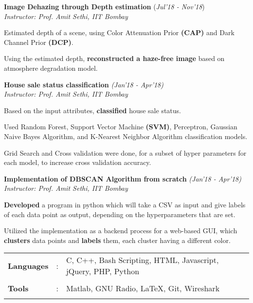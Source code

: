 \documentclass[10pt]{article}
\newcommand{\highlight}[1]{\framecolorbox[\textwidth]{black}{bl}{\makebox[\textwidth][l]{\bfseries \color{black} #1}}}
\newcommand{\guide}[1]{\textit{\textit{\textcolor{llb}{#1}}}}
\begin{document}
\begin{myitemize}
		\item \textbf{Image Dehazing through Depth estimation}
		\hfill{(\textit{Jul'18 - Nov'18})}\\
		\guide{Instructor: Prof. Amit Sethi, IIT Bombay}
		\begin{myitemize}
			\item Estimated depth of a scene, using Color Attenuation Prior \textbf{(CAP)} and Dark Channel Prior \textbf{(DCP)}.
			\item Using the estimated depth, \textbf{reconstructed a haze-free image} based on atmosphere degradation model.
		\end{myitemize}

		\item \textbf{House sale status classification}
		\hfill{\textit{(Jan'18 - Apr'18)}}\\
		\guide{Instructor: Prof. Amit Sethi, IIT Bombay}
		\begin{myitemize}
			\item Based on the input attributes, \textbf{classified} house sale status.
			\item Used Random Forest, Support Vector Machine \textbf{(SVM)}, Perceptron, Gaussian Naive Bayes Algorithm, and K-Nearest Neighbor Algorithm classification models.
			\item Grid Search and Cross validation were done, for a subset of hyper parameters for each model, to increase cross validation accuracy.
		\end{myitemize}

		\item \textbf{Implementation of DBSCAN Algorithm from scratch}
		\hfill{\textit{(Jan'18 - Apr'18)}}\\
		\guide{Instructor: Prof. Amit Sethi, IIT Bombay}
		\begin{myitemize}
			\item \textbf{Developed} a program in python which will take a CSV as input and give labels of each data point as output, depending on the hyperparameters that are set.
			\item Utilized the implementation as a backend process for a web-based GUI, which \textbf{clusters} data points and \textbf{labels} them, each cluster having a different color.
		\end{myitemize}
	\end{myitemize}

	\highlight{TECHNICAL SKILLS}
	\begin{tabular}{m{1in}m{0.20in}m{4.5in}}
		\\[-3mm]
		\textbf{Languages} &: & {{C, C++, Bash Scripting, HTML, Javascript, jQuery, PHP, Python}} \\
		\\[-3.5mm]
		\textbf{Tools} &: & {Matlab, GNU Radio, \LaTeX, Git, Wireshark}\\
		\\[-4mm]
	\end{tabular}
\end{document}
